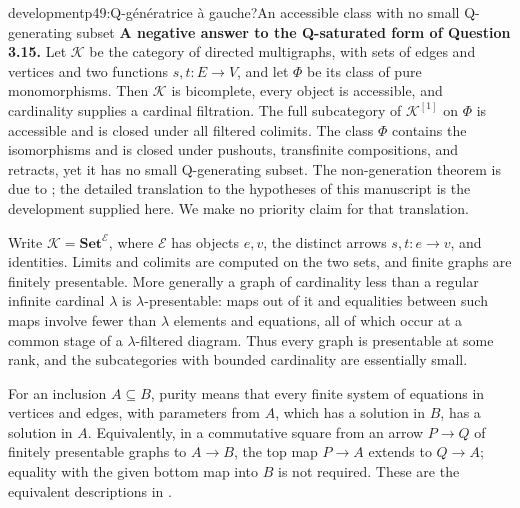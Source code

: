 \begin{dcomment}{development}{p49:Q-génératrice à gauche?}{An accessible class with no small Q-generating subset}
\textbf{A negative answer to the Q-saturated form of Question 3.15.}\ours
Let $\mathcal K$ be the category of directed multigraphs, with sets of edges and vertices and two functions $s,t:E\to V$, and let $\Phi$ be its class of pure monomorphisms. Then $\mathcal K$ is bicomplete, every object is accessible, and cardinality supplies a cardinal filtration. The full subcategory of $\mathcal K^{[1]}$ on $\Phi$ is accessible and is closed under all filtered colimits. The class $\Phi$ contains the isomorphisms and is closed under pushouts, transfinite compositions, and retracts, yet it has no small Q-generating subset. The non-generation theorem is due to \citet[Theorem~5.1]{CoxEtAl2026Pure}; the detailed translation to the hypotheses of this manuscript is the development supplied here. We make no priority claim for that translation.

Write $\mathcal K=\mathbf{Set}^{\mathcal E}$, where $\mathcal E$ has objects $e,v$, the distinct arrows $s,t:e\to v$, and identities. Limits and colimits are computed on the two sets, and finite graphs are finitely presentable. More generally a graph of cardinality less than a regular infinite cardinal $\lambda$ is $\lambda$-presentable: maps out of it and equalities between such maps involve fewer than $\lambda$ elements and equations, all of which occur at a common stage of a $\lambda$-filtered diagram. Thus every graph is presentable at some rank, and the subcategories with bounded cardinality are essentially small.

For an inclusion $A\subseteq B$, purity means that every finite system of equations in vertices and edges, with parameters from $A$, which has a solution in $B$, has a solution in $A$. Equivalently, in a commutative square from an arrow $P\to Q$ of finitely presentable graphs to $A\to B$, the top map $P\to A$ extends to $Q\to A$; equality with the given bottom map into $B$ is not required. These are the equivalent descriptions in \citet[Definition~2.7 and Remark~2.8]{CoxEtAl2026Pure}.


\end{dcomment}
